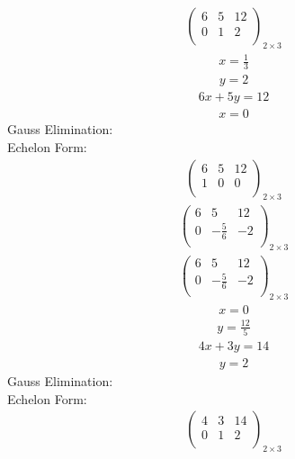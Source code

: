 \documentclass{article}
\begin{document}
\begin{align*}
\left(
\begin{array}{cc|c}
6 & 5 & 12\\
0 & 1 & 2\\
\end{array}
\right)_{2\times 3}
\end{align*}
\begin{align*}
x=\frac{1}{3}\end{align*}
\begin{align*}
y=2\end{align*}
\begin{align*}
6x + 5y=12\end{align*}
\begin{align*}
x=0\end{align*}
Gauss Elimination:\\
Echelon Form:\\
\begin{align*}
\left(
\begin{array}{cc|c}
6 & 5 & 12\\
1 & 0 & 0\\
\end{array}
\right)_{2\times 3}
\end{align*}
\begin{align*}
\left(
\begin{array}{cc|c}
6 & 5 & 12\\
0 & -\frac{5}{6} & -2\\
\end{array}
\right)_{2\times 3}
\end{align*}
\begin{align*}
\left(
\begin{array}{cc|c}
6 & 5 & 12\\
0 & -\frac{5}{6} & -2\\
\end{array}
\right)_{2\times 3}
\end{align*}
\begin{align*}
x=0\end{align*}
\begin{align*}
y=\frac{12}{5}\end{align*}
\begin{align*}
4x + 3y=14\end{align*}
\begin{align*}
y=2\end{align*}
Gauss Elimination:\\
Echelon Form:\\
\begin{align*}
\left(
\begin{array}{cc|c}
4 & 3 & 14\\
0 & 1 & 2\\
\end{array}
\right)_{2\times 3}
\end{align*}
\end{document}
